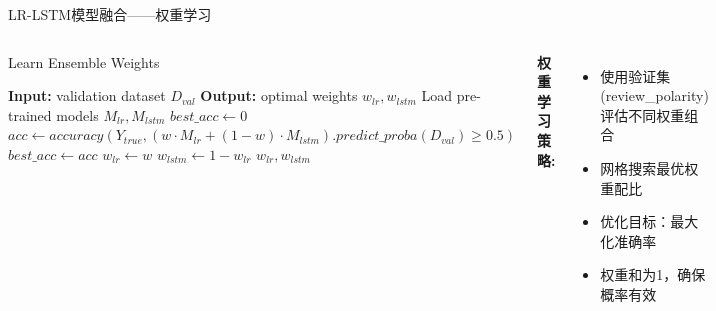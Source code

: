 \documentclass{beamer}
\begin{document}
\begin{frame}[fragile]{LR-LSTM模型融合——权重学习}
    \begin{columns}[T]
        \begin{algorithm}[H]
        \scriptsize
        \caption{Learn Ensemble Weights}
        \begin{algorithmic}[1]
        \STATE \textbf{Input:} validation dataset $D_{val}$
        \STATE \textbf{Output:} optimal weights $w_{lr}, w_{lstm}$
        \STATE Load pre-trained models $M_{lr}, M_{lstm}$
        \STATE $best\_acc \gets 0$
            \STATE $acc \gets accuracy(Y_{true}, (w \cdot M_{lr} + (1-w) \cdot M_{lstm}).predict\_proba(D_{val}) \geq 0.5)$
                \STATE $best\_acc \gets acc$
                \STATE $w_{lr} \gets w$
            \ENDIF
        \ENDFOR
        \STATE $w_{lstm} \gets 1 - w_{lr}$
        \STATE \RETURN $w_{lr}, w_{lstm}$
        \end{algorithmic}
        \end{algorithm}
        
        \vspace{0.5cm}
        \textbf{权重学习策略:}
        \begin{itemize}
            \item 使用验证集(review\_polarity)评估不同权重组合
            \item 网格搜索最优权重配比
            \item 优化目标：最大化准确率
            \item 权重和为1，确保概率有效
        \end{itemize}
    \end{columns}
\end{frame}
\end{document}

